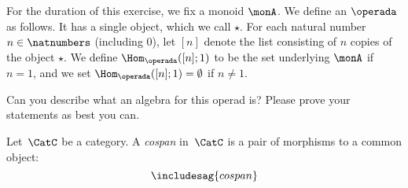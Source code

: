 \begin{gradedexercise}\label{ex:MonoidsActionsAsAlgebras}
For the duration of this exercise, we fix a monoid $\monA$. 
We define an $\operada$ as follows. It has a single object, which we call $\star$.  For each natural number $n \in \natnumbers$ (including $0$), let $[n]$ denote the list consisting of $n$ copies of the object $\star$. We define $\Hom_\operada([n];1)$ to be the set underlying $\monA$ if $n =1$, and we set $\Hom_\operada([n];1) = \emptyset$ if $n \neq 1$. 

Can you describe what an algebra for this operad is?  Please prove your statements as best you can. 
\end{gradedexercise}






\begin{definition}
  \label{def:cospan}
  Let~$\CatC$ be a category. A \emph{cospan} in~$\CatC$ is a pair of morphisms to a common object:
  \begin{equation}
    \includesag{cospan}
  \end{equation}
\end{definition}




\devel{

\begin{forslides}
  \begin{equation*}
\label{eq:composition_operad}
    [\mora,\morb]\mthen \morc
\end{equation*}
\end{forslides}

}

